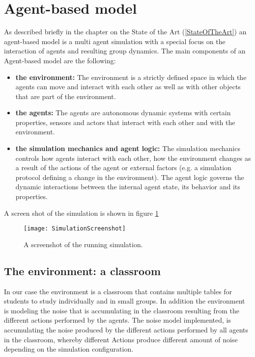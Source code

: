 \section{Agent-based model}
As described briefly in the chapter on the State of the Art (\ref{StateOfTheArt})
an agent-based model is a multi agent simulation with a special focus on the interaction
of agents and resulting group dynamics. The main components of an Agent-based
model are the following:

\begin{itemize}
    \item \textbf{the environment:} The environment is a strictly
    defined space in which the agents can move and interact with each other as 
    well as with other objects that are part of the environment. 
    \item \textbf{the agents:} The agents are autonomous dynamic systems with certain
    properties, sensors and actors that interact with each other and with the environment.
    \item \textbf{the simulation mechanics and agent logic:}  The simulation mechanics
    controls how agents interact with each other, how the environment changes
    as a result of the actions of the agent or external factors (e.g. a simulation protocol defining
    a change in the environment). The agent logic governs the dynamic interactions between
    the internal agent state, its behavior and its properties.
\end{itemize}

A screen shot of the simulation is shown in figure \ref{SimulationScreenshot}

\begin{figure}[]
    \centering
    \texttt{[image: SimulationScreenshot]}
    \caption{A screenshot of the running simulation.}
    \label{SimulationScreenshot}
\end{figure}

\subsection{The environment: a classroom}
In our case the environment is a classroom that contains multiple tables for
students to study individually and in small groups. In addition the environment
is modeling the noise that is accumulating in the classroom resulting from the
different actions performed by the agents. The noise model implemented, is
accumulating the noise produced by the different actions
performed by all agents in the classroom, whereby different Actions produce different
amount of noise depending on the simulation configuration.

